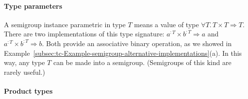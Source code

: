 \paragraph{Type parameters}

A semigroup instance parametric in type $T$ means a value of type
$\forall T.\,T\times T\Rightarrow T$. There are two implementations
of this type signature: $a^{:T}\times b^{:T}\Rightarrow a$ and $a^{:T}\times b^{:T}\Rightarrow b$.
Both provide an associative binary operation, as we showed in Example~\ref{subsec:tc-Example-semigroup-alternative-implementations}(a).
In this way, any type $T$ can be made into a semigroup. (Semigroups
of this kind are rarely useful.)

\paragraph{Product types}

